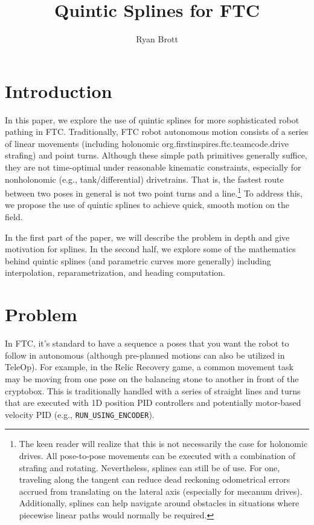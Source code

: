 \documentclass{article}
\title{Quintic Splines for FTC}
\author{Ryan Brott}
\date{}
\begin{document}
\maketitle

\section{Introduction}
In this paper, we explore the use of quintic splines for more sophisticated robot pathing in FTC. Traditionally, FTC robot autonomous motion consists of a series of linear movements (including holonomic org.firstinspires.ftc.teamcode.drive strafing) and point turns. Although these simple path primitives generally suffice, they are not time-optimal under reasonable kinematic constraints, especially for nonholonomic (e.g., tank/differential) drivetrains. That is, the fastest route between two poses in general is not two point turns and a line.\footnote{The keen reader will realize that this is not necessarily the case for holonomic drives. All pose-to-pose movements can be executed with a combination of strafing and rotating. Nevertheless, splines can still be of use. For one, traveling along the tangent can reduce dead reckoning odometrical errors accrued from translating on the lateral axis (especially for mecanum drives). Additionally, splines can help navigate around obstacles in situations where piecewise linear paths would normally be required.} To address this, we propose the use of quintic splines to achieve quick, smooth motion on the field.

In the first part of the paper, we will describe the problem in depth and give motivation for splines. In the second half, we explore some of the mathematics behind quintic splines (and parametric curves more generally) including interpolation, reparametrization, and heading computation.

\section{Problem}
In FTC, it's standard to have a sequence a poses that you want the robot to follow in autonomous (although pre-planned motions can also be utilized in TeleOp). For example, in the Relic Recovery game, a common movement task may be moving from one pose on the balancing stone to another in front of the cryptobox. This is traditionally handled with a series of straight lines and turns that are executed with 1D position PID controllers and potentially motor-based velocity PID (e.g., \texttt{RUN\_USING\_ENCODER}).
\end{document}

